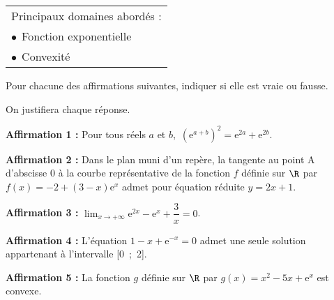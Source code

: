 
\smallskip

\begin{tabular}{|l|}\hline
Principaux domaines abordés :\\
\hspace{1.25cm}$\bullet~~$Fonction exponentielle\\
\hspace{1.25cm}$\bullet~~$Convexité\\ \hline
\end{tabular}

\medskip

Pour chacune des affirmations suivantes, indiquer si elle est vraie ou fausse. 

On justifiera chaque réponse. 

\medskip

\textbf{Affirmation 1 :} Pour tous réels $a$ et $b$,\, $\left(\text{e}^{a+b}\right)^2 = \text{e}^{2a} + \text{e}^{2b}$.

\smallskip
\textbf{Affirmation 2 :}  Dans le plan muni d'un repère, la tangente au point A d'abscisse 0 à la courbe représentative de la fonction $f$ définie sur $\R$ par $f(x) = - 2 + (3 - x)\text{e}^x$ admet pour équation réduite $y = 2x + 1$.

\smallskip
\textbf{Affirmation 3 :} $\displaystyle\lim_{x \to + \infty} \text{e}^{2x} - \text{e}^{x} + \dfrac{3}{x}= 0$.

\smallskip
\textbf{Affirmation 4 :} L'équation $1 - x + \text{e}^{-x} = 0$ admet une seule solution appartenant à l'intervalle [0~;~2].

\smallskip
\textbf{Affirmation 5 :} La fonction $g$ définie sur $\R$ par $g(x) = x^2 - 5x + \text{e}^x$ est convexe.

\bigskip

